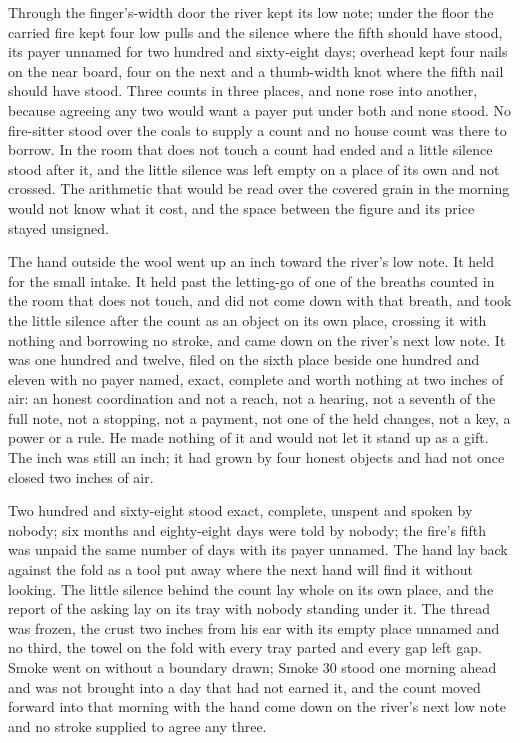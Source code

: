 Through the finger's-width door the river kept its low note; under the floor the carried fire kept four low pulls and the silence where the fifth should have stood, its payer unnamed for two hundred and sixty-eight days; overhead  kept four nails on the near board, four on the next and a thumb-width knot where the fifth nail should have stood. Three counts in three places, and none rose into another, because agreeing any two would want a payer put under both and none stood. No fire-sitter stood over the coals to supply a count and no house count was there to borrow. In the room that does not touch a count had ended and a little silence stood after it, and the little silence was left empty on a place of its own and not crossed. The arithmetic that would be read over the covered grain in the morning would not know what it cost, and the space between the figure and its price stayed unsigned.

The hand outside the wool went up an inch toward the river's low note. It held for the small intake. It held past the letting-go of one of the breaths counted in the room that does not touch, and did not come down with that breath, and took the little silence after the count as an object on its own place, crossing it with nothing and borrowing no stroke, and came down on the river's next low note. It was one hundred and twelve, filed on the sixth place beside one hundred and eleven with no payer named, exact, complete and worth nothing at two inches of air: an honest coordination and not a reach, not a hearing, not a seventh of the full note, not a stopping, not a payment, not one of the held changes, not a key, a power or a rule. He made nothing of it and would not let it stand up as a gift. The inch was still an inch; it had grown by four honest objects and had not once closed two inches of air.

Two hundred and sixty-eight stood exact, complete, unspent and spoken by nobody; six months and eighty-eight days were told by nobody; the fire's fifth was unpaid the same number of days with its payer unnamed. The hand lay back against the fold as a tool put away where the next hand will find it without looking. The little silence behind the count lay whole on its own place, and the report of the asking lay on its tray with nobody standing under it. The thread was frozen, the crust two inches from his ear with its empty place unnamed and no third, the towel on the fold with every tray parted and every gap left gap. Smoke went on without a boundary drawn; Smoke 30 stood one morning ahead and was not brought into a day that had not earned it, and the count moved forward into that morning with the hand come down on the river's next low note and no stroke supplied to agree any three.
